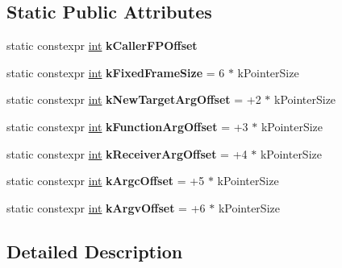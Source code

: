 \subsection*{Static Public Attributes}
\begin{DoxyCompactItemize}
\item 
static constexpr \mbox{\hyperlink{classint}{int}} {\bfseries k\+Caller\+F\+P\+Offset}
\item 
\mbox{\label{classv8_1_1internal_1_1EntryFrameConstants_acc36ad80c4c0be431b9d4c6694bfee42}} 
static constexpr \mbox{\hyperlink{classint}{int}} {\bfseries k\+Fixed\+Frame\+Size} = 6 $\ast$ k\+Pointer\+Size
\item 
\mbox{\label{classv8_1_1internal_1_1EntryFrameConstants_ad8564c722ce742b1aa4181d67fc27511}} 
static constexpr \mbox{\hyperlink{classint}{int}} {\bfseries k\+New\+Target\+Arg\+Offset} = +2 $\ast$ k\+Pointer\+Size
\item 
\mbox{\label{classv8_1_1internal_1_1EntryFrameConstants_a354b34fc5f871bfcd693e86ff1d3afa9}} 
static constexpr \mbox{\hyperlink{classint}{int}} {\bfseries k\+Function\+Arg\+Offset} = +3 $\ast$ k\+Pointer\+Size
\item 
\mbox{\label{classv8_1_1internal_1_1EntryFrameConstants_a69b4e14b65751fa925285a2de9b182f9}} 
static constexpr \mbox{\hyperlink{classint}{int}} {\bfseries k\+Receiver\+Arg\+Offset} = +4 $\ast$ k\+Pointer\+Size
\item 
\mbox{\label{classv8_1_1internal_1_1EntryFrameConstants_aa2250875af7ff69776341399308d97cd}} 
static constexpr \mbox{\hyperlink{classint}{int}} {\bfseries k\+Argc\+Offset} = +5 $\ast$ k\+Pointer\+Size
\item 
\mbox{\label{classv8_1_1internal_1_1EntryFrameConstants_a6823cb4412da04621643c86764079625}} 
static constexpr \mbox{\hyperlink{classint}{int}} {\bfseries k\+Argv\+Offset} = +6 $\ast$ k\+Pointer\+Size
\end{DoxyCompactItemize}


\subsection{Detailed Description}


